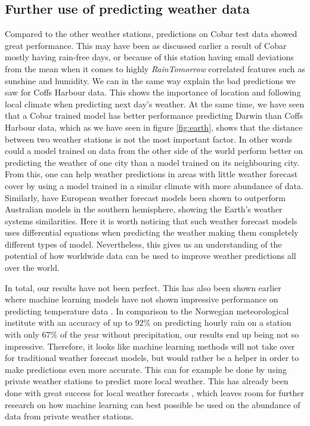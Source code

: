 \documentclass[11pt]{article}
\begin{document}
\subsection{Further use of predicting weather data}
Compared to the other weather stations, predictions on Cobar test data showed great performance. This may have been as discussed earlier a result of Cobar mostly having rain-free days, or because of this station having small deviations from the mean when it comes to highly \textit{RainTomorrow} correlated features such as sunshine and humidity. We can in the same way explain the bad predictions we saw for Coffs Harbour data. This shows the importance of location and following local climate when predicting next day's weather.
At the same time, we have seen that a Cobar trained model has better performance predicting Darwin than Coffs Harbour data, which as we have seen in figure \ref{fig:earth}, shows that the distance between two weather stations is not the most important factor. In other words could a model trained on data from the other side of the world perform better on predicting the weather of one city than a model trained on its neighbouring city. From this, one can help weather predictions in areas with little weather forecast cover by using a model trained in a similar climate with more abundance of data. Similarly, have European weather forecast models been shown to outperform Australian models in the southern hemisphere\cite{australian_model}, showing the Earth's weather systems similarities. Here it is worth noticing that such weather forecast models uses differential equations when predicting the weather making them completely different types of model. Nevertheless, this gives us an understanding of the potential of how worldwide data can be used to improve weather predictions all over the world.

In total, our results have not been perfect. This has also been shown earlier where machine learning models have not shown impressive performance on predicting temperature data \cite{forecast}. In comparison to the Norwegian meteorological institute with an accuracy of up to 92\% \cite{nettavisen}\cite{yr} on predicting hourly rain on a station with only 67\% of the year without precipitation\cite{klima}, our results end up being not so impressive. Therefore, it looks like machine learning methods will not take over for traditional weather forecast models, but would rather be a helper in order to make predictions even more accurate. This can for example be done by using private weather stations to predict more local weather. This has already been done with great success for local weather forecasts \cite{yr}, which leaves room for further research on how machine learning can best possible be used on the abundance of data from private weather stations.
\end{document}

